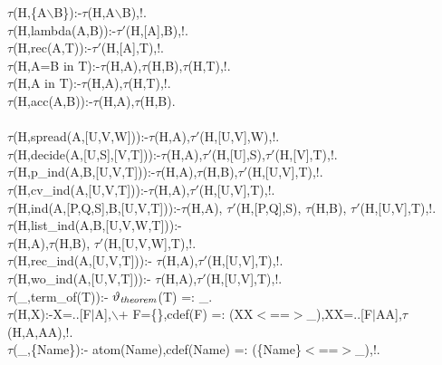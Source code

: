 \documentclass[11pt]{report}
\begin{document}
\begin{sf}
\begin{tabbing}
$\tau$(H,\{A$\backslash$B\}):-$\tau$(H,A$\backslash$B),!.\\[-0.15ex]
$\tau$(H,lambda(A,B)):-$\tau'$(H,[A],B),!.\\[-0.15ex]
$\tau$(H,rec(A,T)):-$\tau'$(H,[A],T),!.\\[-0.15ex]
$\tau$(H,A=B in T):-$\tau$(H,A),$\tau$(H,B),$\tau$(H,T),!.\\[-0.15ex]
$\tau$(H,A in T):-$\tau$(H,A),$\tau$(H,T),!.\\[-0.15ex]
$\tau$(H,acc(A,B)):-$\tau$(H,A),$\tau$(H,B).\\[-0.7ex]
\\[-0.15ex]
$\tau$(H,spread(A,[U,V,W])):-$\tau$(H,A),$\tau'$(H,[U,V],W),!.\\[-0.15ex]
$\tau$(H,decide(A,[U,S],[V,T])):-$\tau$(H,A),$\tau'$(H,[U],S),$\tau'$(H,[V],T),!.\\[-0.15ex]
$\tau$(H,p\_\hspace{0.1em}ind(A,B,[U,V,T])):-$\tau$(H,A),$\tau$(H,B),$\tau'$(H,[U,V],T),!.\\[-0.15ex]
$\tau$(H,cv\_\hspace{0.1em}ind(A,[U,V,T])):-$\tau$(H,A),$\tau'$(H,[U,V],T),!.\\[-0.15ex]
$\tau$(H,ind(A,[P,Q,S],B,[U,V,T])):-$\tau$(H,A), $\tau'$(H,[P,Q],S), $\tau$(H,B), $\tau'$(H,[U,V],T),!.\\[-0.15ex]
$\tau$(H,list\_\hspace{0.1em}ind(A,B,[U,V,W,T])):-\\[-0.15ex]
\hspace{2em}$\tau$(H,A),$\tau$(H,B), $\tau'$(H,[U,V,W],T),!.\\[-0.15ex]
$\tau$(H,rec\_\hspace{0.1em}ind(A,[U,V,T])):- $\tau$(H,A),$\tau'$(H,[U,V],T),!.\\[-0.15ex]
$\tau$(H,wo\_\hspace{0.1em}ind(A,[U,V,T])):- $\tau$(H,A),$\tau'$(H,[U,V],T),!.\\[-0.15ex]
$\tau$(\_\hspace{0.1em},term\_\hspace{0.1em}of(T)):- $\vartheta_{\it theorem}$(T) =: \_\hspace{0.1em}.\\[-0.15ex]
$\tau$(H,X):-X=..[F$\mid$A],$\backslash$+ F=\{\},cdef(F) =: (XX$<$==$>$\_\hspace{0.1em}),XX=..[F$\mid$AA],$\tau$(H,A,AA),!.\\[-0.15ex]
$\tau$(\_\hspace{0.1em},\{Name\}):- atom(Name),cdef(Name) =: (\{Name\}$<$==$>$\_\hspace{0.1em}),!.\\[-0.15ex]

\end{tabbing}
\end{sf}
\end{document}
